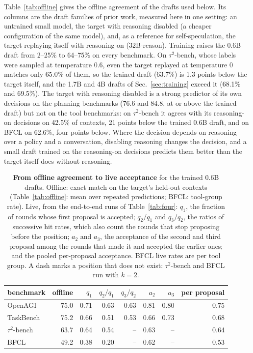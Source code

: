 Table~\ref{tab:offline} gives the offline agreement of the drafts used below. Its columns are the draft
families of prior work, measured here in one setting: an untrained small model, the target with reasoning
disabled (a cheaper configuration of the same model), and, as a reference for self-speculation, the target
replaying itself with reasoning on (32B-reason). Training raises the 0.6B draft from 2--25\% to 64--75\% on every benchmark. On $\tau^2$-bench, whose labels were sampled at temperature 0.6, even the target replayed at temperature 0 matches only 65.0\% of them, so the trained draft (63.7\%) is 1.3 points below the target itself, and the 1.7B and 4B drafts of Sec.~\ref{sec:training} exceed it (68.1\% and 69.5\%). The target with reasoning disabled is a strong
predictor of its own decisions on the planning benchmarks (76.6 and 84.8, at or above the trained draft)
but not on the tool benchmarks: on $\tau^2$-bench it agrees with its reasoning-on decisions on 42.5\% of
contexts, 21 points below the trained 0.6B draft, and on BFCL on 62.6\%, four points below. Where the
decision depends on reasoning over a policy and a conversation, disabling reasoning changes the decision,
and a small draft trained on the reasoning-on decisions predicts them better than the target itself does
without reasoning.

\begin{table}[t]
\centering
\caption{\textbf{From offline agreement to live acceptance} for the trained 0.6B drafts. Offline:
exact match on the target's held-out contexts (Table~\ref{tab:offline}: mean over repeated predictions; BFCL: tool-group rate). Live,
from the end-to-end runs of Table~\ref{tab:four}: $q_1$, the fraction of rounds whose first proposal is
accepted; $q_2/q_1$ and $q_3/q_2$, the ratios of successive hit rates, which also count the rounds that
stop proposing before the position; $a_2$ and $a_3$, the acceptance of the second and third proposal
among the rounds that made it and accepted the earlier ones; and the pooled per-proposal acceptance.
BFCL live rates are per tool group. A dash marks a position that does not exist: $\tau^2$-bench and BFCL run
with $k{=}2$.}
\label{tab:agree}
\small
\begin{tabular}{lrrrrrrr}
\toprule
benchmark & offline & $q_1$ & $q_2/q_1$ & $q_3/q_2$ & $a_2$ & $a_3$ & per proposal \\
\midrule
OpenAGI   & 75.0 & 0.71 & 0.63 & 0.63 & 0.81 & 0.80 & 0.75 \\
TaskBench & 75.2 & 0.66 & 0.51 & 0.53 & 0.66 & 0.73 & 0.68 \\
$\tau^2$-bench   & 63.7 & 0.64 & 0.54 & --   & 0.63 & --   & 0.64 \\
BFCL      & 49.2 & 0.38 & 0.20 & --   & 0.62 & --   & 0.53 \\
\bottomrule
\end{tabular}
\end{table}

